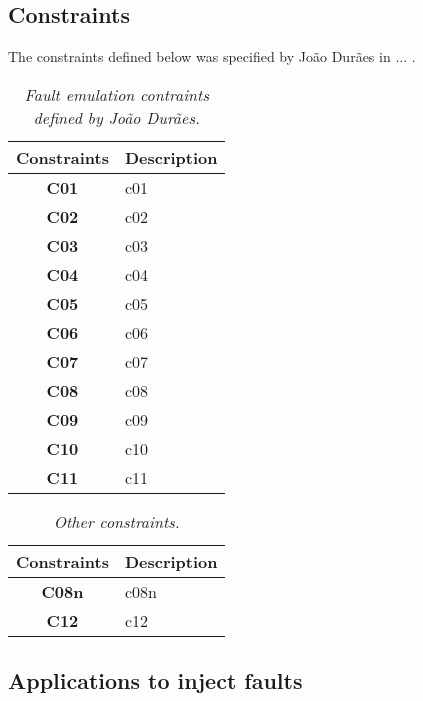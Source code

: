 \subsection{Constraints}

The constraints defined below was specified by João Durães in ... .

\begin{table}[!ht]
\centering
\begin{tabular}{|c|p{12cm}|}
\hline
\textbf{Constraints}            & \multicolumn{1}{c|}{\textbf{Description}}                                     \\ \hline \hline
\textbf{C01}         & \Acl{c01} \\ \hline
\textbf{C02}         & \Acl{c02} \\ \hline
\textbf{C03}         & \Acl{c03} \\ \hline
\textbf{C04}         & \Acl{c04} \\ \hline
\textbf{C05}         & \Acl{c05} \\ \hline
\textbf{C06}         & \Acl{c06} \\ \hline
\textbf{C07}         & \Acl{c07} \\ \hline
\textbf{C08}         & \Acl{c08} \\ \hline
\textbf{C09}         & \Acl{c09} \\ \hline
\textbf{C10}         & \Acl{c10} \\ \hline
\textbf{C11}         & \Acl{c11} \\ \hline
\end{tabular}
\caption{\small \sl Fault emulation contraints defined by João Durães.\label{tab:faultEmulationConstraintsDuraes}}
\end{table}

\begin{table}[!ht]
\centering
\begin{tabular}{|c|p{12cm}|}
\hline
\textbf{Constraints}            & \multicolumn{1}{c|}{\textbf{Description}}                                     \\ \hline \hline
\textbf{C08n}         & \Acl{c08n} \\ \hline
\textbf{C12}         & \Acl{c12} \\ \hline
\end{tabular}
\caption{\small \sl Other constraints.\label{tab:otherConstraints}}
\end{table}

\clearpage
\subsection{Applications to inject faults}

